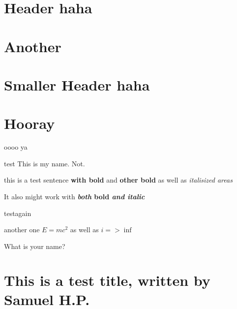 \documentclass{article}
\begin{document}
\section*{\huge{Header haha}}
\normalsize{}

\section*{\LARGE{Another}}
\normalsize{}

\section*{\Large{Smaller Header haha}}
\normalsize{}

\section*{\large{Hooray}}
\normalsize{}

oooo ya

test This is my name. Not.

this is a test sentence \textbf{with bold} and \textbf{other bold} as well as \textit{italisized areas}

It also might work with \textbf{\textit{both }bold\textit{ and italic}}

testagain

another one
$E=mc^2$ as well as $i => \inf$

What is your name?

\section*{\huge{This is a test title, written by Samuel H.P.}}
\normalsize{}
\end{document}
